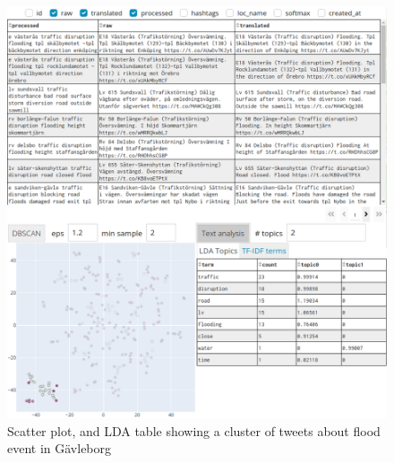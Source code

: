 \begin{figure}[H]
  \begin{center}
    \includegraphics[width=\columnwidth, trim={0cm 0cm 0cm 14.5cm},clip]{./images/gavle_text_analysis.png}
  \end{center}
  \caption{Scatter plot, and \ac{LDA} table showing a cluster of tweets about flood event in Gävleborg}
  \label{fig:gavle_text_analysis_scatter_tables}
\end{figure}

